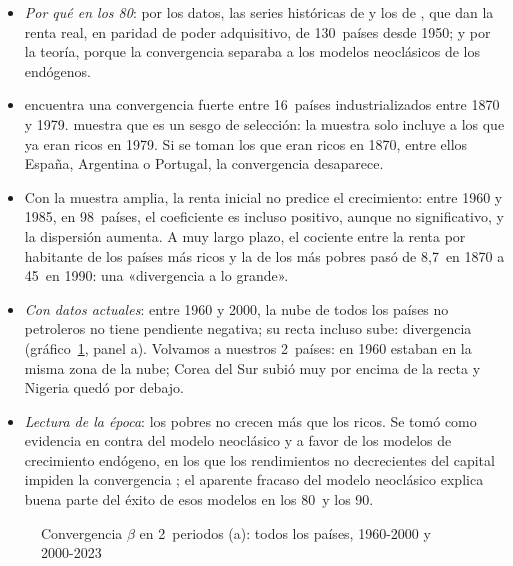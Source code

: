 \documentclass[11pt]{article}
\begin{document}
\begin{itemize}
\item \emph{Por qué en los 80}: por los datos, las series históricas de  y los de \textcite{SummersHeston1988}, que dan la renta real, en paridad de poder adquisitivo, de 130~países desde 1950; y por la teoría, porque la convergencia separaba a los modelos neoclásicos de los endógenos.
\item \textcite{Baumol1986} encuentra una convergencia fuerte entre 16~países industrializados entre 1870 y 1979. \textcite{DeLong1988} muestra que es un sesgo de selección: la muestra solo incluye a los que ya eran ricos en 1979. Si se toman los que eran ricos en 1870, entre ellos España, Argentina o Portugal, la convergencia desaparece.
\item Con la muestra amplia, la renta inicial no predice el crecimiento: entre 1960 y 1985, en 98~países, el coeficiente es incluso positivo, aunque no significativo, y la dispersión aumenta\nocite{MankiwRomerWeil1992}. A muy largo plazo, el cociente entre la renta por habitante de los países más ricos y la de los más pobres pasó de 8,7~en 1870 a 45~en 1990: una «divergencia a lo grande»\nocite{Pritchett1997}.
\item \emph{Con datos actuales}: entre 1960 y 2000, la nube de todos los países no petroleros no tiene pendiente negativa; su recta incluso sube: divergencia (gráfico~\ref{fig:convergencia-periodos-a}, panel a). Volvamos a nuestros 2~países: en 1960 estaban en la misma zona de la nube; Corea del Sur subió muy por encima de la recta y Nigeria quedó por debajo.
\item \emph{Lectura de la época}: los pobres no crecen más que los ricos. Se tomó como evidencia en contra del modelo neoclásico y a favor de los modelos de crecimiento endógeno, en los que los rendimientos no decrecientes del capital impiden la convergencia ; el aparente fracaso del modelo neoclásico explica buena parte del éxito de esos modelos en los 80~y los 90.
\end{itemize}

\begin{figure}[H]
\centering
\caption{Convergencia $\beta$ en 2~periodos (a): todos los países, 1960-2000 y 2000-2023}\label{fig:convergencia-periodos-a}
\end{figure}
\end{document}
